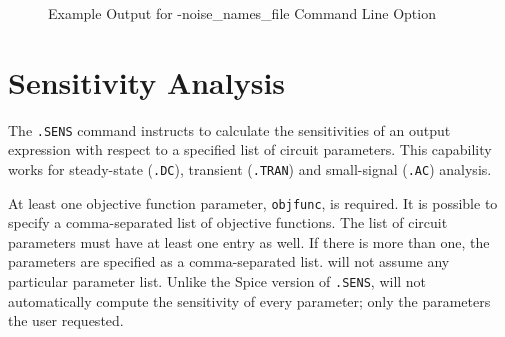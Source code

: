 \begin{figure}[htbp]
  \begin{centering}
\caption[Example Output for -noise\_names\_file Command Line Option]
{Example Output for -noise\_names\_file Command Line Option\label{NoiseNamesFile} }
\end{centering}
\end{figure}

\clearpage
\section{Sensitivity Analysis}
\label{SENS_Analysis}
\label{sensitivity_Overview}

The \texttt{.SENS}  command instructs \Xyce{} to
calculate the sensitivities of an output expression with respect to a
specified list of circuit parameters.  This capability works for
steady-state (\texttt{.DC}), transient (\texttt{.TRAN}) and 
small-signal (\texttt{.AC}) analysis.


At least one objective function parameter, \texttt{objfunc}, is
required.  It is possible to specify a comma-separated list of
objective functions.  The list of circuit parameters must have at
least one entry as well.  If there is more than one, the parameters
are specified as a comma-separated list.  \Xyce{} will not assume any
particular parameter list.  Unlike the Spice version of
\texttt{.SENS}, \Xyce{} will not automatically compute the sensitivity
of every parameter; only the parameters the user requested.

